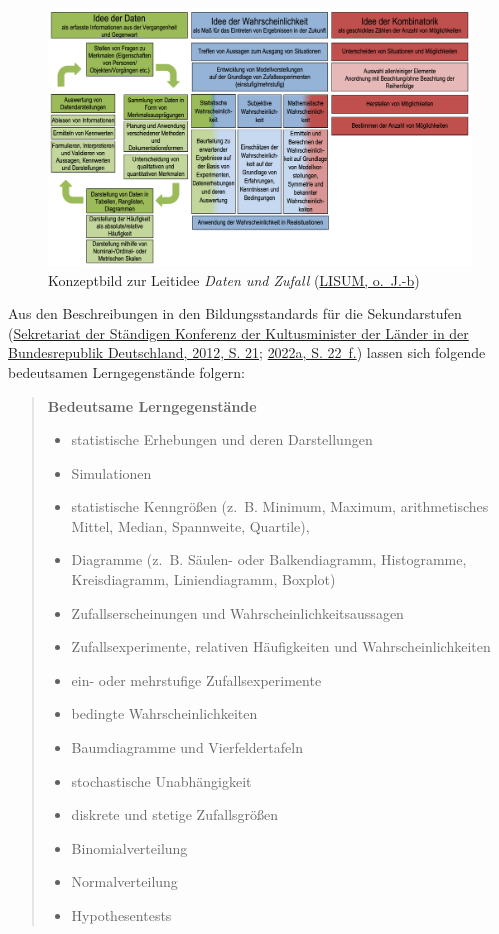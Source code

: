 \documentclass[
]{scrbook}
\providecommand{\tightlist}{%
  \setlength{\itemsep}{0pt}\setlength{\parskip}{0pt}}
\theoremstyle{definition}
\theoremstyle{definition}
\theoremstyle{definition}
\theoremstyle{definition}
\theoremstyle{remark}
\begin{document}
\begin{figure}

{\centering \includegraphics[width=0.9\linewidth]{pictures/14-KonzeptDatenZufall} 

}

\caption{Konzeptbild zur Leitidee \emph{Daten und Zufall} (\protect\hyperlink{ref-LISUMa}{LISUM, o.~J.-b})}\label{fig:KonzeptDatenZufall}
\end{figure}

Aus den Beschreibungen in den Bildungsstandards für die Sekundarstufen (\protect\hyperlink{ref-KMK:2012}{Sekretariat der Ständigen Konferenz der Kultusminister der Länder in der Bundesrepublik Deutschland, 2012, S. 21}; \protect\hyperlink{ref-SekretariatderStandigenKonferenzderKultusministerderLanderinderBundesrepublikDeutschland2022}{2022a, S. 22~f.}) lassen sich folgende bedeutsamen Lerngegenstände folgern:

\begin{quote}
\textbf{Bedeutsame Lerngegenstände}

\begin{itemize}
\tightlist
\item
  statistische Erhebungen und deren Darstellungen
\item
  Simulationen
\item
  statistische Kenngrößen (z.~B. Minimum, Maximum, arithmetisches Mittel, Median, Spannweite, Quartile),
\item
  Diagramme (z.~B. Säulen- oder Balkendiagramm, Histogramme, Kreisdiagramm, Liniendiagramm, Boxplot)
\item
  Zufallserscheinungen und Wahrscheinlichkeitsaussagen
\item
  Zufallsexperimente, relativen Häufigkeiten und Wahrscheinlichkeiten
\item
  ein- oder mehrstufige Zufallsexperimente
\item
  bedingte Wahrscheinlichkeiten
\item
  Baumdiagramme und Vierfeldertafeln
\item
  stochastische Unabhängigkeit
\item
  diskrete und stetige Zufallsgrößen
\item
  Binomialverteilung
\item
  Normalverteilung
\item
  Hypothesentests
\end{itemize}
\end{quote}
\end{document}
